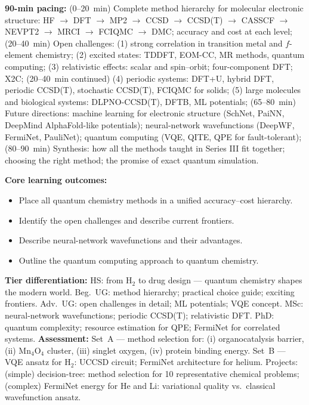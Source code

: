 \documentclass[11pt,a4paper]{article}
\begin{document}
\medskip

\begin{tcolorbox}[chembox, title={Module~III.3 / L12: Synthesis and Outlook}]
\textbf{90-min pacing:} (0--20~min) Complete method hierarchy for molecular electronic structure: HF $\to$ DFT $\to$ MP2 $\to$ CCSD $\to$ CCSD(T) $\to$ CASSCF $\to$ NEVPT2 $\to$ MRCI $\to$ FCIQMC $\to$ DMC; accuracy and cost at each level; (20--40~min) Open challenges: (1) strong correlation in transition metal and $f$-element chemistry; (2) excited states: TDDFT, EOM-CC, MR methods, quantum computing; (3) relativistic effects: scalar and spin--orbit; four-component DFT; X2C; (20--40~min continued) (4) periodic systems: DFT+U, hybrid DFT, periodic CCSD(T), stochastic CCSD(T), FCIQMC for solids; (5) large molecules and biological systems: DLPNO-CCSD(T), DFTB, ML potentials; (65--80~min) Future directions: machine learning for electronic structure (SchNet, PaiNN, DeepMind AlphaFold-like potentials); neural-network wavefunctions (DeepWF, FermiNet, PauliNet); quantum computing (VQE, QITE, QPE for fault-tolerant); (80--90~min) Synthesis: how all the methods taught in Series III fit together; choosing the right method; the promise of exact quantum simulation.

\medskip\textbf{Core learning outcomes:}
\begin{itemize}[leftmargin=1.4em,topsep=2pt,itemsep=1pt]
  \item Place all quantum chemistry methods in a unified accuracy--cost hierarchy.
  \item Identify the open challenges and describe current frontiers.
  \item Describe neural-network wavefunctions and their advantages.
  \item Outline the quantum computing approach to quantum chemistry.
\end{itemize}
\medskip\textbf{Tier differentiation:}
HS: from H$_2$ to drug design --- quantum chemistry shapes the modern world.
Beg.\ UG: method hierarchy; practical choice guide; exciting frontiers.
Adv.\ UG: open challenges in detail; ML potentials; VQE concept.
MSc: neural-network wavefunctions; periodic CCSD(T); relativistic DFT.
PhD: quantum complexity; resource estimation for QPE; FermiNet for correlated systems.
\medskip\textbf{Assessment:}
Set~A --- method selection for: (i) organocatalysis barrier, (ii) Mn$_4$O$_4$ cluster, (iii) singlet oxygen, (iv) protein binding energy.
Set~B --- VQE ansatz for H$_2$: UCCSD circuit; FermiNet architecture for helium.
Projects: (simple) decision-tree: method selection for 10 representative chemical problems; (complex) FermiNet energy for He and Li: variational quality vs.\ classical wavefunction ansatz.
\end{tcolorbox}
\end{document}
